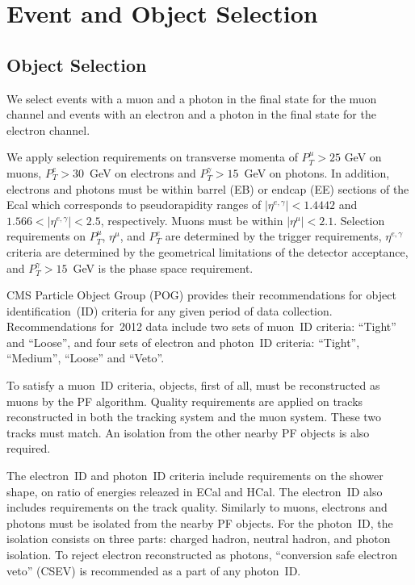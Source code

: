 \section{Event and Object Selection}
\label{sec:AN_Selection}

\subsection{Object Selection}
\label{sec:AN_ObjectSelection}

We select events with a muon and a photon in the final state for the muon channel and events with an electron and a photon in the final state for the electron channel. 

We apply selection requirements on transverse momenta of $P_T^{\mu}>25$ GeV on muons,  $P_T^e>30$~GeV on electrons and $P_T^{\gamma}>15$~GeV on photons. In addition, electrons and photons must be within barrel (EB) or endcap (EE) sections of the Ecal which corresponds to pseudorapidity ranges of $|\eta^{e,\gamma}| < 1.4442$ and $1.566 < |\eta^{e,\gamma}| < 2.5$, respectively. Muons must be within $|\eta^{\mu}|<2.1$. Selection requirements on $P_T^{\mu}$, $\eta^{\mu}$, and $P_T^e$ are determined by the trigger requirements, $\eta^{e,\gamma}$ criteria are determined by the geometrical limitations of the detector acceptance, and $P_T^{\gamma}>15$~GeV is the phase space requirement.

CMS Particle Object Group (POG) provides their recommendations for object identification~(ID) criteria for any given period of data collection. Recommendations for~2012 data include two sets of muon~ID criteria: ``Tight'' and ``Loose'', and four sets of electron and photon~ID criteria: ``Tight'', ``Medium'', ``Loose'' and ``Veto''. 

To satisfy a muon~ID criteria, objects, first of all, must be reconstructed as muons by the PF algorithm. Quality requirements are applied on tracks reconstructed in both the tracking system and the muon system. These two tracks must match. An isolation from the other nearby PF objects is also required. 

The electron~ID and photon~ID criteria include requirements on the shower shape, on ratio of energies releazed in ECal and HCal. The electron~ID also includes requirements on the track quality. Similarly to muons, electrons and photons must be isolated from the nearby PF objects. For the photon~ID, the isolation consists on three parts: charged hadron, neutral hadron, and photon isolation. To reject electron reconstructed as photons, ``conversion safe electron veto'' (CSEV) is recommended as a part of any photon~ID.

